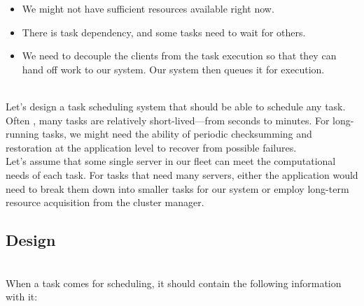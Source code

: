 \begin{itemize}
\item
\protect{}\label{xZib4nzJ2TYCPjisYlvbp}
We might not have sufficient resources available right now.
\item
\protect{}\label{a06ZRykVgJ_pialDGDxhj}
There is task dependency, and some tasks need to wait for others.
\item
\protect{}\label{SXhQSFPenJHlLtg23uF-3}
We need to decouple the clients from the task execution so that they can hand off work to our system. Our system then queues it for execution.
\end{itemize}
\\
Let's design a task scheduling system that should be able to schedule any task. Often , many tasks are relatively short-lived---from seconds to minutes. For long-running tasks, we might need the ability of periodic checksumming and restoration at the application level to recover from possible failures.
\\
Let's assume that some single server in our fleet can meet the computational needs of each task. For tasks that need many servers, either the application would need to break them down into smaller tasks for our system or employ long-term resource acquisition from the cluster manager.

\subsection{Design}\label{hr5xAwBErfwFq6URFVM4V}
\\
When a task comes for scheduling, it should contain the following information with it:

